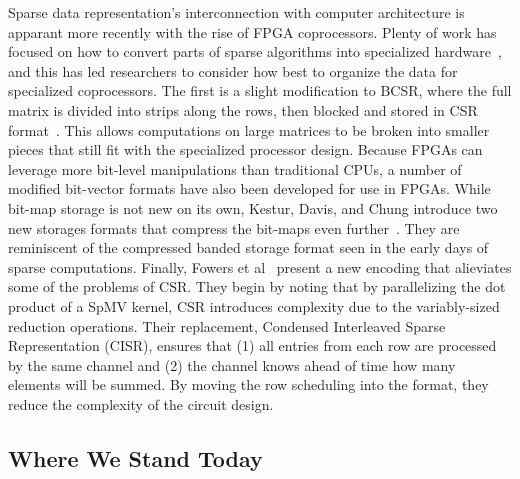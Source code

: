 Sparse data representation's interconnection with computer architecture is apparant more recently with the rise of FPGA coprocessors. 
Plenty of work has focused on how to convert parts of sparse algorithms into specialized hardware~\cite{elgindy2002sparse,zhuo2005sparse,gregg2007fpga,prasanna2007sparse,jain2020domain,kapre2009parallelizing}, and this has led researchers to consider how best to organize the data for specialized coprocessors. 
The first is a slight modification to BCSR, where the full matrix is divided into strips along the rows, then blocked and stored in CSR format~\cite{sun2007sparse}. 
This allows computations on large matrices to be broken into smaller pieces that still fit with the specialized processor design.
Because FPGAs can leverage more bit-level manipulations than traditional CPUs, a number of modified bit-vector formats have also been developed for use in FPGAs. 
While bit-map storage is not new on its own, Kestur, Davis, and Chung introduce two new storages formats that compress the bit-maps even further~\cite{kestur2012towards}.
They are reminiscent of the compressed banded storage format seen in the early days of sparse computations.
Finally, Fowers et al~\cite{fowers2014high} present a new encoding that alieviates some of the problems of CSR.
They begin by noting that by parallelizing the dot product of a SpMV kernel, CSR introduces complexity due to the variably-sized reduction operations.
Their replacement, Condensed Interleaved Sparse Representation (CISR), ensures that (1) all entries from each row are processed by the same channel and (2) the channel knows ahead of time how many elements will be summed.
By moving the row scheduling into the format, they reduce the complexity of the circuit design.






\cite{im2001optimizing}
\cite{im2004sparsity}

\cite{vuduc2005oski}


\cite{chang1997towards}
\cite{lujan2005storage}


\cite{fu1996run}



\subsection{Where We Stand Today}





